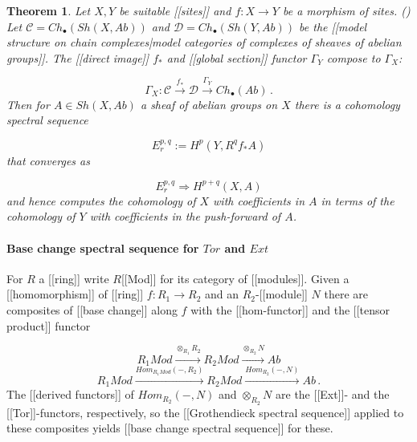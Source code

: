 \documentclass[12pt,titlepage]{article}
\theoremstyle{plain}
\newtheorem{theorem}{Theorem}
\theoremstyle{definition}
\theoremstyle{remark}
\begin{document}
\begin{theorem}
Let $X, Y$ be suitable [[sites]] and $f : X \to Y$ be a morphism of sites. () Let $\mathcal{C} = Ch_\bullet(Sh(X,Ab))$ and $\mathcal{D} = Ch_\bullet(Sh(Y,Ab))$ be the [[model structure on chain complexes|model categories of complexes of sheaves of abelian groups]]. The [[direct image]] $f_*$ and [[global section]] functor $\Gamma_Y$ compose to $\Gamma_X$:

\begin{displaymath}
\Gamma_X : \mathcal{C} \stackrel{f_*}{\to} \mathcal{D} \stackrel{\Gamma_Y}{\to} Ch_\bullet(Ab)
  \,.
\end{displaymath}
Then for $A \in Sh(X,Ab)$ a sheaf of abelian groups on $X$ there is a cohomology spectral sequence

\begin{displaymath}
E_r^{p,q} := H^p(Y, R^q f_* A)
\end{displaymath}
that converges as

\begin{displaymath}
E_r^{p,q} \Rightarrow H^{p+q}(X, A)
\end{displaymath}
and hence computes the cohomology of $X$ with coefficients in $A$ in terms of the cohomology of $Y$ with coefficients in the push-forward of $A$.

\end{theorem}
\hypertarget{BaseChangeSpectralSequence}{}\paragraph*{{Base change spectral sequence for $Tor$ and $Ext$}}\label{BaseChangeSpectralSequence}

For $R$ a [[ring]] write $R$[[Mod]] for its category of [[modules]]. Given a [[homomorphism]] of [[ring]] $f : R_1 \to R_2$ and an $R_2$-[[module]] $N$ there are composites of [[base change]] along $f$ with the [[hom-functor]] and the [[tensor product]] functor

\begin{displaymath}
R_1 Mod \stackrel{\otimes_{R_1} R_2}{\to} R_2 Mod \stackrel{\otimes_{R_2} N}{\to} Ab
\end{displaymath}
\begin{displaymath}
R_1 Mod \stackrel{Hom_{R_1 Mod}(-,R_2)}{\to}
  R_2 Mod
  \stackrel{Hom_{R_2}(-,N)}{\to}
  Ab
  \,.
\end{displaymath}
The [[derived functors]] of $Hom_{R_2}(-,N)$ and $\otimes_{R_2} N$ are the [[Ext]]- and the [[Tor]]-functors, respectively, so the [[Grothendieck spectral sequence]] applied to these composites yields [[base change spectral sequence]] for these.
\end{document}
